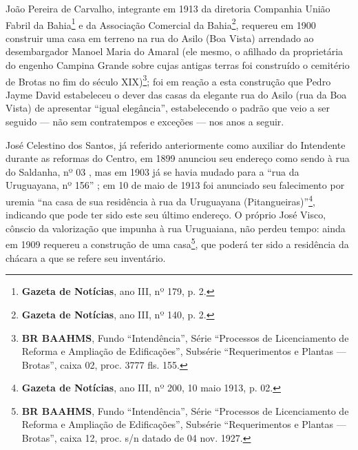 João Pereira de Carvalho, integrante em 1913 da diretoria Companhia União Fabril da Bahia\footnote{\textbf{Gazeta de Notícias}, ano III, nº 179, p. 2.} e da Associação Comercial da Bahia\footnote{\textbf{Gazeta de Notícias}, ano III, nº 140, p. 2.}, requereu em 1900 construir uma casa em terreno na rua do Asilo (Boa Vista) arrendado ao desembargador Manoel Maria do Amaral (ele mesmo, o afilhado da proprietária do engenho Campina Grande sobre cujas antigas terras foi construído o cemitério de Brotas no fim do século XIX)\footnote{\textbf{BR BAAHMS}, Fundo ``Intendência'', Série ``Processos de Licenciamento de Reforma e Ampliação de Edificações'', Subsérie ``Requerimentos e Plantas --- Brotas'', caixa 02, proc. 3777 fls. 155.}; foi em reação a esta construção que Pedro Jayme David estabeleceu o dever das casas da elegante rua do Asilo (rua da Boa Vista) de apresentar ``igual elegância'', estabelecendo o padrão que veio a ser seguido --- não sem contratempos e exceções --- nos anos a seguir.

José Celestino dos Santos, já referido anteriormente como auxiliar do Intendente durante as reformas do Centro, em 1899 anunciou seu endereço como sendo à rua do Saldanha, nº 03 \cite[p.~477]{almanak_1899}, mas em 1903 já se havia mudado para a ``rua da Uruguayana, nº 156'' \cite[p.~345]{reis_almanak_1903}; em 10 de maio de 1913 foi anunciado seu falecimento por uremia ``na casa de sua residência à rua da Uruguayana (Pitangueiras)''\footnote{\textbf{Gazeta de Notícias}, ano III, nº 200, 10 maio 1913, p. 02.}, indicando que pode ter sido este seu último endereço. O próprio José Visco, cônscio da valorização que impunha à rua Uruguaiana, não perdeu tempo: ainda em 1909 requereu a construção de uma casa\footnote{\textbf{BR BAAHMS}, Fundo ``Intendência'', Série ``Processos de Licenciamento de Reforma e Ampliação de Edificações'', Subsérie ``Requerimentos e Plantas --- Brotas'', caixa 12, proc. s/n datado de 04 nov. 1927.}, que poderá ter sido a residência da chácara a que se refere seu inventário.

